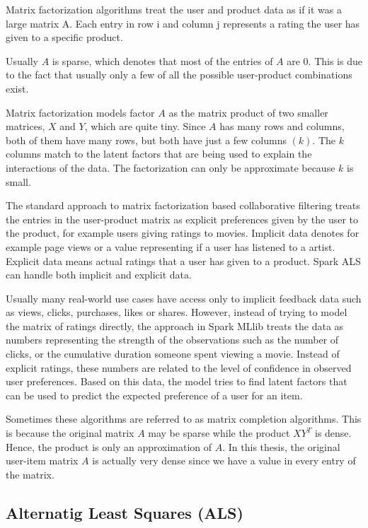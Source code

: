 \documentclass[12pt,a4paper,english
]{tutthesis}
\begin{document}
Matrix factorization algorithms treat the user and product data as if it was a large matrix A. Each entry in row i and column j represents a rating the user has given to a specific product. \cite{ryza15}

Usually $A$ is sparse, which denotes that most of the entries of $A$ are 0. This is due to the fact that usually only a few of all the possible user-product combinations exist.

Matrix factorization models factor $A$ as the matrix product of two smaller matrices, $X$ and $Y$, which are quite tiny. Since $A$ has many rows and columns, both of them have many rows, but both have just a few columns $(k)$. The $k$ columns match to the latent factors that are being used to explain the interactions of the data. The factorization can only be approximate because $k$ is small. \cite{ryza15}

The standard approach to matrix factorization based collaborative filtering treats the entries in the user-product matrix as explicit preferences given by the user to the product, for example users giving ratings to movies. Implicit data denotes for example page views or a value representing if a user has listened to a artist. Explicit data means actual ratings that a user has given to a product. Spark ALS can handle both implicit and explicit data. \cite{spark14} \cite{ryza15}

Usually many real-world use cases have access only to implicit feedback data such as views, clicks, purchases, likes or shares. However, instead of trying to model the matrix of ratings directly, the approach in Spark MLlib treats the data as numbers representing the strength of the observations such as the number of clicks, or the cumulative duration someone spent viewing a movie. Instead of explicit ratings, these numbers are related to the level of confidence in observed user preferences. Based on this data, the model tries to find latent factors that can be used to predict the expected preference of a user for an item. \cite{spark14}

Sometimes these algorithms are referred to as matrix completion algorithms. This is because the original matrix $A$ may be sparse while the product $XY^T$ is dense. Hence, the product is only an approximation of $A$. \cite{ryza15} In this thesis, the original user-item matrix $A$ is actually very dense since we have a value in every entry of the matrix.

\subsection{Alternatig Least Squares (ALS)}
\end{document}
